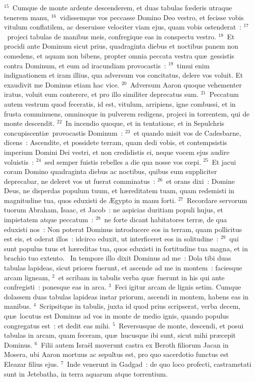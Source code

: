 ${}^{15}$~Cumque de monte ardente descenderem, et duas tabulas fœderis utraque tenerem manu,
${}^{16}$~vidissemque vos peccasse Domino Deo vestro, et fecisse vobis vitulum conflatilem, ac deseruisse velociter viam ejus, quam vobis ostenderat~:
${}^{17}$~projeci tabulas de manibus meis, confregique eas in conspectu vestro.
${}^{18}$~Et procidi ante Dominum sicut prius, quadraginta diebus et noctibus panem non comedens, et aquam non bibens, propter omnia peccata vestra qu\ae\ gessistis contra Dominum, et eum ad iracundiam provocastis~:
${}^{19}$~timui enim indignationem et iram illius, qua adversum vos concitatus, delere vos voluit. Et exaudivit me Dominus etiam hac vice.
${}^{20}$~Adversum Aaron quoque vehementer iratus, voluit eum conterere, et pro illo similiter deprecatus sum.
${}^{21}$~Peccatum autem vestrum quod feceratis, id est, vitulum, arripiens, igne combussi, et in frusta comminuens, omninoque in pulverem redigens, projeci in torrentem, qui de monte descendit.
${}^{22}$~In incendio quoque, et in tentatione, et in Sepulchris concupiscenti\ae\ provocastis Dominum~:
${}^{23}$~et quando misit vos de Cadesbarne, dicens~: Ascendite, et possidete terram, quam dedi vobis, et contempsistis imperium Domini Dei vestri, et non credidistis ei, neque vocem ejus audire voluistis~:
${}^{24}$~sed semper fuistis rebelles a die qua nosse vos cœpi.
${}^{25}$~Et jacui coram Domino quadraginta diebus ac noctibus, quibus eum suppliciter deprecabar, ne deleret vos ut fuerat comminatus~:
${}^{26}$~et orans dixi~: Domine Deus, ne disperdas populum tuum, et h\ae reditatem tuam, quam redemisti in magnitudine tua, quos eduxisti de \AE gypto in manu forti.
${}^{27}$~Recordare servorum tuorum Abraham, Isaac, et Jacob~: ne aspicias duritiam populi hujus, et impietatem atque peccatum~:
${}^{28}$~ne forte dicant habitatores terr\ae , de qua eduxisti nos~: Non poterat Dominus introducere eos in terram, quam pollicitus est eis, et oderat illos~: idcirco eduxit, ut interficeret eos in solitudine~:
${}^{29}$~qui sunt populus tuus et h\ae reditas tua, quos eduxisti in fortitudine tua magna, et in brachio tuo extento.
~In tempore illo dixit Dominus ad me~: Dola tibi duas tabulas lapideas, sicut priores fuerunt, et ascende ad me in montem~: faciesque arcam ligneam,
${}^{2}$~et scribam in tabulis verba qu\ae\ fuerunt in his qui ante confregisti~: ponesque eas in arca.
${}^{3}$~Feci igitur arcam de lignis setim. Cumque dolassem duas tabulas lapideas instar priorum, ascendi in montem, habens eas in manibus.
${}^{4}$~Scripsitque in tabulis, juxta id quod prius scripserat, verba decem, qu\ae\ locutus est Dominus ad vos in monte de medio ignis, quando populus congregatus est~: et dedit eas mihi.
${}^{5}$~Reversusque de monte, descendi, et posui tabulas in arcam, quam feceram, qu\ae\ hucusque ibi sunt, sicut mihi pr\ae cepit Dominus.
${}^{6}$~Filii autem Isra\"el moverunt castra ex Beroth filiorum Jacan in Mosera, ubi Aaron mortuus ac sepultus est, pro quo sacerdotio functus est Eleazar filius ejus.
${}^{7}$~Inde venerunt in Gadgad~: de quo loco profecti, castrametati sunt in Jetebatha, in terra aquarum atque torrentium.



